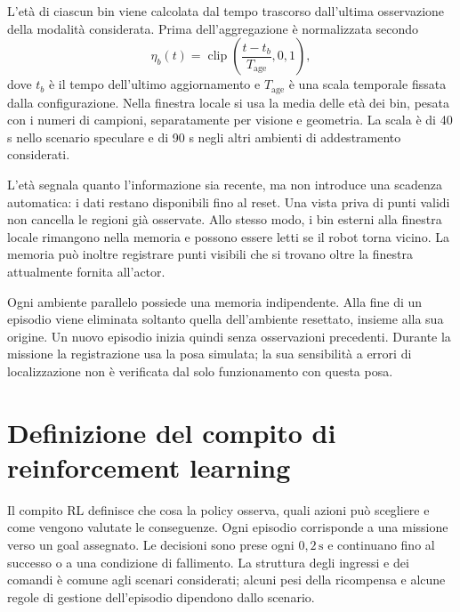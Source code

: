 L'età di ciascun bin viene calcolata dal tempo trascorso dall'ultima osservazione della modalità considerata. Prima dell'aggregazione è normalizzata secondo
\begin{equation}
    \eta_b(t)=\operatorname{clip}
            \left(\frac{t-t_b}{T_{\mathrm{age}}},0,1\right),
    \label{eq:metodo-eta-memoria}
\end{equation}
\nopagebreak[3]
dove $t_b$ è il tempo dell'ultimo aggiornamento e $T_{\mathrm{age}}$ è una scala temporale fissata dalla configurazione. Nella finestra locale si usa la media delle età dei bin, pesata con i numeri di campioni, separatamente per visione e geometria. La scala è di 40 s nello scenario speculare e di 90 s negli altri ambienti di addestramento considerati.

L'età segnala quanto l'informazione sia recente, ma non introduce una scadenza automatica: i dati restano disponibili fino al reset. Una vista priva di punti validi non cancella le regioni già osservate. Allo stesso modo, i bin esterni alla finestra locale rimangono nella memoria e possono essere letti se il robot torna vicino. La memoria può inoltre registrare punti visibili che si trovano oltre la finestra attualmente fornita all'actor.

Ogni ambiente parallelo possiede una memoria indipendente. Alla fine di un episodio viene eliminata soltanto quella dell'ambiente resettato, insieme alla sua origine. Un nuovo episodio inizia quindi senza osservazioni precedenti. Durante la missione la registrazione usa la posa simulata; la sua sensibilità a errori di localizzazione non è verificata dal solo funzionamento con questa posa.

\section[Definizione del compito di reinforcement learning]{Definizione del compito di\\reinforcement learning}
\label{sec:metodo-compito-rl}

Il compito RL definisce che cosa la policy osserva, quali azioni può scegliere e come vengono valutate le conseguenze. Ogni episodio corrisponde a una missione verso un goal assegnato. Le decisioni sono prese ogni $0{,}2\,\mathrm{s}$ e continuano fino al successo o a una condizione di fallimento. La struttura degli ingressi e dei comandi è comune agli scenari considerati; alcuni pesi della ricompensa e alcune regole di gestione dell'episodio dipendono dallo scenario.

